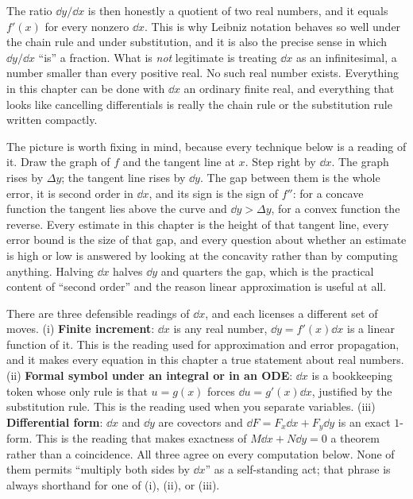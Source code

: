 The ratio $\dd y/\dd x$ is then honestly a quotient of two real numbers, and it equals $f'(x)$ for every nonzero $\dd x$. This is why Leibniz notation behaves so well under the chain rule and under substitution, and it is also the precise sense in which $\dd y/\dd x$ ``is'' a fraction. What is \emph{not} legitimate is treating $\dd x$ as an infinitesimal, a number smaller than every positive real. No such real number exists. Everything in this chapter can be done with $\dd x$ an ordinary finite real, and everything that looks like cancelling differentials is really the chain rule or the substitution rule written compactly.

The picture is worth fixing in mind, because every technique below is a reading of it. Draw the graph of $f$ and the tangent line at $x$. Step right by $\dd x$. The graph rises by $\Delta y$; the tangent line rises by $\dd y$. The gap between them is the whole error, it is second order in $\dd x$, and its sign is the sign of $f''$: for a concave function the tangent lies above the curve and $\dd y>\Delta y$, for a convex function the reverse. Every estimate in this chapter is the height of that tangent line, every error bound is the size of that gap, and every question about whether an estimate is high or low is answered by looking at the concavity rather than by computing anything. Halving $\dd x$ halves $\dd y$ and quarters the gap, which is the practical content of ``second order'' and the reason linear approximation is useful at all.

\begin{keynote}
There are three defensible readings of $\dd x$, and each licenses a different set of moves. (i) \textbf{Finite increment}: $\dd x$ is any real number, $\dd y=f'(x)\dd x$ is a linear function of it. This is the reading used for approximation and error propagation, and it makes every equation in this chapter a true statement about real numbers. (ii) \textbf{Formal symbol under an integral or in an ODE}: $\dd x$ is a bookkeeping token whose only rule is that $u=g(x)$ forces $\dd u=g'(x)\dd x$, justified by the substitution rule. This is the reading used when you separate variables. (iii) \textbf{Differential form}: $\dd x$ and $\dd y$ are covectors and $\dd F=F_x\dd x+F_y\dd y$ is an exact $1$-form. This is the reading that makes exactness of $M\dd x+N\dd y=0$ a theorem rather than a coincidence. All three agree on every computation below. None of them permits ``multiply both sides by $\dd x$'' as a self-standing act; that phrase is always shorthand for one of (i), (ii), or (iii).
\end{keynote}

